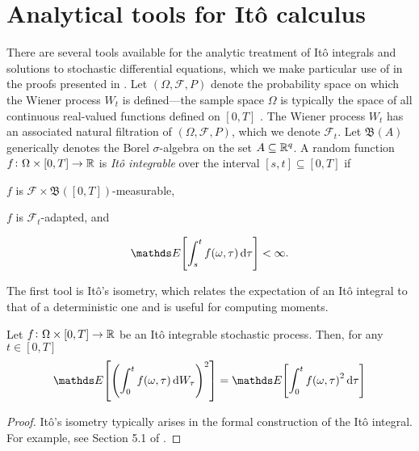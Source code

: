\section{Analytical tools for It\^o calculus}\label{app:ito_tools}
There are several tools available for the analytic treatment of It\^o integrals and solutions to stochastic differential equations, which we make particular use of in the proofs presented in .
Let \(\left(\Omega, \mathcal{F}, P\right)\) denote the probability space on which the Wiener process \(W_t\) is defined---the sample space \(\Omega\) is typically the space of all continuous real-valued functions defined on \([0,T]\) \citep{KallianpurSundar_2014_StochasticAnalysisDiffusion}.
The Wiener process \(W_t\) has an associated natural filtration of \(\left(\Omega, \mathcal{F}, P\right)\), which we denote \(\mathcal{F}_t\).
Let \(\mathfrak{B}\!\left(A\right)\) generically denotes the Borel \(\sigma\)-algebra on the set \(A \subseteq \mathbb{R}^q\).
A random function \(f\colon \Omega \times [0,T] \to \mathbb{R}\) is \emph{It\^o integrable} over the interval \([s,t] \subseteq [0,T]\) if \citep{Oksendal_2003_StochasticDifferentialEquations,KallianpurSundar_2014_StochasticAnalysisDiffusion}
\begin{romanate}
	\item \(f\) is \(\mathcal{F} \times \mathfrak{B}\!\left([0,T]\right)\)-measurable,
	\item \(f\) is \(\mathcal{F}_t\)-adapted, and
	\item \[
		\avg{\int_s^t{f\!\left(\omega, \tau\right)\dif\tau}} < \infty.
	\]
\end{romanate}

The first tool is It\^o's isometry, which relates the expectation of an It\^o integral to that of a deterministic one and is useful for computing moments.

\begin{theorem}[It\^o's Isometry]\label{thm:ito_isom}
	Let \(f\colon \Omega \times [0,T] \to \mathbb{R}\) be an It\^o integrable stochastic process.
	Then, for any \(t \in [0,T]\)
	\[
		\avg{\left(\int_0^t{f\!\left(\omega, \tau\right)\dif W_\tau}\right)^2} = \avg{\int_0^t{f\!\left(\omega, \tau\right)^2\dif\tau}}
	\]
\end{theorem}

\begin{proof}
	It\^o's isometry typically arises in the formal construction of the It\^o integral.
	For example, see Section 5.1 of \citet{KallianpurSundar_2014_StochasticAnalysisDiffusion}.
\end{proof}

